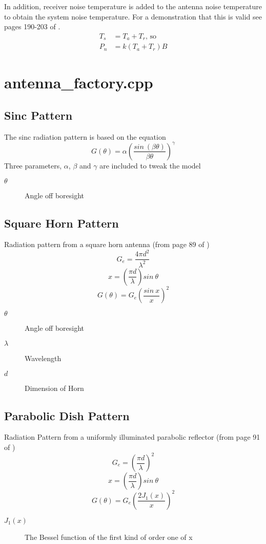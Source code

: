 \documentclass[a4paper,10pt]{article}
\begin{document}
\par
In addition, receiver noise temperature is added to the antenna noise temperature to obtain the system noise temperature. For a demonstration that this is valid see pages 190-203 of \cite{stremler}.
\begin{align}
T_s &= T_a + T_r{\text{, so}} \\
P_n &= k (T_a+T_r) B
\end{align}


\section{antenna_factory.cpp}

\subsection{Sinc Pattern}
The sinc radiation pattern is based on the equation
\begin{equation}
G(\theta)=\alpha\left(\frac{sin~(\beta\theta)}{\beta\theta}\right)^\gamma
\end{equation}
Three parameters, $\alpha$, $\beta$ and $\gamma$ are included to tweak the model
\begin{description}
 \item[$\theta$] Angle off boresight
\end{description}

\subsection{Square Horn Pattern}
Radiation pattern from a square horn antenna (from page 89 of \cite{gagli86})
$$G_e=\frac{4\pi d^2}{\lambda^2}$$
$$x = \left(\frac{\pi d}{\lambda}\right)sin~\theta$$
$$G(\theta) = G_e\left(\frac{sin~x}{x}\right)^2$$
\begin{description}
 \item[$\theta$] Angle off boresight
\item[$\lambda$] Wavelength
\item[$d$] Dimension of Horn
\end{description}

\subsection{Parabolic Dish Pattern}
Radiation Pattern from a uniformly illuminated parabolic reflector (from page 91 of \cite{gagli86})
$$G_e=\left(\frac{\pi d}{\lambda}\right)^2$$
$$x = \left(\frac{\pi d}{\lambda}\right)sin~\theta$$
$$G(\theta) = G_e\left(\frac{2 J_1(x)}{x}\right)^2$$
\begin{description}
 \item[$J_1(x)$] The Bessel function of the first kind of order one of x
\end{description}
\end{document}

